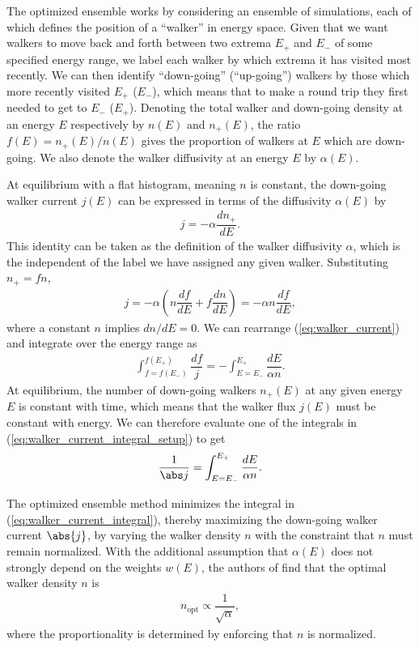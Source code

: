 \documentclass[11pt]{article}
\renewcommand{\t}{\text} %
\newcommand{\f}[2]{\dfrac{#1}{#2}} %
\newcommand{\p}[1]{\left(#1\right)} %
\begin{document}
The optimized ensemble works by considering an ensemble of
simulations, each of which defines the position of a ``walker'' in
energy space. Given that we want walkers to move back and forth
between two extrema $E_+$ and $E_-$ of some specified energy range, we
label each walker by which extrema it has visited most recently. We
can then identify ``down-going'' (``up-going'') walkers by those which
more recently visited $E_+$ ($E_-$), which means that to make a round
trip they first needed to get to $E_-$ ($E_+$). Denoting the total
walker and down-going density at an energy $E$ respectively by
$n\p{E}$ and $n_+\p{E}$, the ratio $f\p{E}=n_+\p{E}/n\p{E}$ gives the
proportion of walkers at $E$ which are down-going. We also denote the
walker diffusivity at an energy $E$ by $\alpha\p{E}$.

At equilibrium with a flat histogram, meaning $n$ is constant, the
down-going walker current $j\p{E}$ can be expressed in terms of the
diffusivity $\alpha\p{E}$ by
\begin{align}
  j=-\alpha\f{dn_+}{dE}.
  \label{eq:walker_current_definition}
\end{align}
This identity can be taken as the definition of the walker diffusivity
$\alpha$, which is the independent of the label we have assigned any
given walker. Substituting $n_+=fn$,
\begin{align}
  j=-\alpha\p{n\f{df}{dE}+f\f{dn}{dE}}=-\alpha n\f{df}{dE},
  \label{eq:walker_current}
\end{align}
where a constant $n$ implies $dn/dE=0$. We can rearrange
(\ref{eq:walker_current}) and integrate over the energy range as
\begin{align}
  \int_{f=f\p{E_-}}^{f\p{E_+}}\f{df}{j}=-\int_{E=E_-}^{E_+}\f{dE}{\alpha
    n}.
  \label{eq:walker_current_integral_setup}
\end{align}
At equilibrium, the number of down-going walkers $n_+\p{E}$ at any
given energy $E$ is constant with time, which means that the walker
flux $j\p{E}$ must be constant with energy. We can therefore evaluate
one of the integrals in (\ref{eq:walker_current_integral_setup}) to
get
\begin{align}
  \f1{\abs j}=\int_{E=E_-}^{E_+}\f{dE}{\alpha n}.
  \label{eq:walker_current_integral}
\end{align}

The optimized ensemble method minimizes the integral in
(\ref{eq:walker_current_integral}), thereby maximizing the down-going
walker current $\abs{j}$, by varying the walker density $n$ with the
constraint that $n$ must remain normalized. With the additional
assumption that $\alpha\p{E}$ does not strongly depend on the weights
$w\p{E}$, the authors of \cite{optimized_ensemble} find that the
optimal walker density $n$ is
\begin{align}
  n_{\t{opt}}\propto\f1{\sqrt{\alpha}},
  \label{eq:optimal_walker_density}
\end{align}
where the proportionality is determined by enforcing that $n$ is
normalized.
\end{document}
